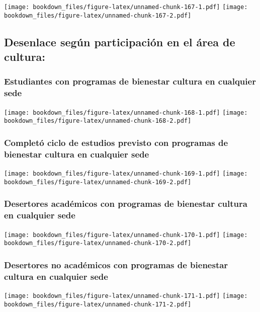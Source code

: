 \documentclass[]{article}
\theoremstyle{definition}
\theoremstyle{definition}
\theoremstyle{definition}
\theoremstyle{remark}
\begin{document}
\texttt{[image: bookdown\_files/figure-latex/unnamed-chunk-167-1.pdf]}
\texttt{[image: bookdown\_files/figure-latex/unnamed-chunk-167-2.pdf]}

\subsection{Desenlace según participación en el área de
cultura:}\label{desenlace-segun-participacion-en-el-area-de-cultura}

\subsubsection{Estudiantes con programas de bienestar cultura en
cualquier
sede}\label{estudiantes-con-programas-de-bienestar-cultura-en-cualquier-sede}

\texttt{[image: bookdown\_files/figure-latex/unnamed-chunk-168-1.pdf]}
\texttt{[image: bookdown\_files/figure-latex/unnamed-chunk-168-2.pdf]}

\subsubsection{Completó ciclo de estudios previsto con programas de
bienestar cultura en cualquier
sede}\label{completo-ciclo-de-estudios-previsto-con-programas-de-bienestar-cultura-en-cualquier-sede}

\texttt{[image: bookdown\_files/figure-latex/unnamed-chunk-169-1.pdf]}
\texttt{[image: bookdown\_files/figure-latex/unnamed-chunk-169-2.pdf]}

\subsubsection{Desertores académicos con programas de bienestar cultura
en cualquier
sede}\label{desertores-academicos-con-programas-de-bienestar-cultura-en-cualquier-sede}

\texttt{[image: bookdown\_files/figure-latex/unnamed-chunk-170-1.pdf]}
\texttt{[image: bookdown\_files/figure-latex/unnamed-chunk-170-2.pdf]}

\subsubsection{Desertores no académicos con programas de bienestar
cultura en cualquier
sede}\label{desertores-no-academicos-con-programas-de-bienestar-cultura-en-cualquier-sede}

\texttt{[image: bookdown\_files/figure-latex/unnamed-chunk-171-1.pdf]}
\texttt{[image: bookdown\_files/figure-latex/unnamed-chunk-171-2.pdf]}
\end{document}
